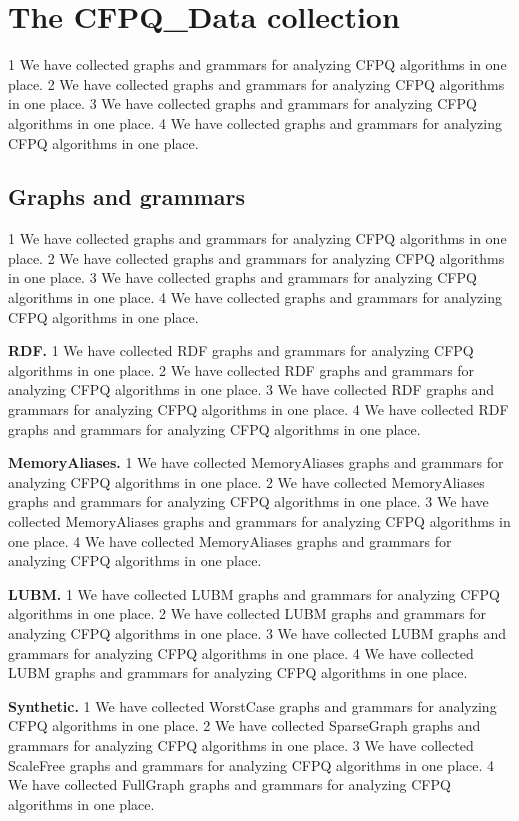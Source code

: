 \documentclass[sigconf]{acmart}
\begin{document}
\section{The CFPQ\_Data collection}
1 We have collected graphs and grammars for analyzing CFPQ algorithms in one place.
2 We have collected graphs and grammars for analyzing CFPQ algorithms in one place.
3 We have collected graphs and grammars for analyzing CFPQ algorithms in one place.
4 We have collected graphs and grammars for analyzing CFPQ algorithms in one place.

\subsection{Graphs and grammars}
1 We have collected graphs and grammars for analyzing CFPQ algorithms in one place.
2 We have collected graphs and grammars for analyzing CFPQ algorithms in one place.
3 We have collected graphs and grammars for analyzing CFPQ algorithms in one place.
4 We have collected graphs and grammars for analyzing CFPQ algorithms in one place.

\textbf{RDF.}
1 We have collected RDF graphs and grammars for analyzing CFPQ algorithms in one place.
2 We have collected RDF graphs and grammars for analyzing CFPQ algorithms in one place.
3 We have collected RDF graphs and grammars for analyzing CFPQ algorithms in one place.
4 We have collected RDF graphs and grammars for analyzing CFPQ algorithms in one place.

\textbf{MemoryAliases.}
1 We have collected MemoryAliases graphs and grammars for analyzing CFPQ algorithms in one place.
2 We have collected MemoryAliases graphs and grammars for analyzing CFPQ algorithms in one place.
3 We have collected MemoryAliases graphs and grammars for analyzing CFPQ algorithms in one place.
4 We have collected MemoryAliases graphs and grammars for analyzing CFPQ algorithms in one place.

\textbf{LUBM.}
1 We have collected LUBM graphs and grammars for analyzing CFPQ algorithms in one place.
2 We have collected LUBM graphs and grammars for analyzing CFPQ algorithms in one place.
3 We have collected LUBM graphs and grammars for analyzing CFPQ algorithms in one place.
4 We have collected LUBM graphs and grammars for analyzing CFPQ algorithms in one place.

\textbf{Synthetic.}
1 We have collected WorstCase graphs and grammars for analyzing CFPQ algorithms in one place.
2 We have collected SparseGraph graphs and grammars for analyzing CFPQ algorithms in one place.
3 We have collected ScaleFree graphs and grammars for analyzing CFPQ algorithms in one place.
4 We have collected FullGraph graphs and grammars for analyzing CFPQ algorithms in one place.
\end{document}
